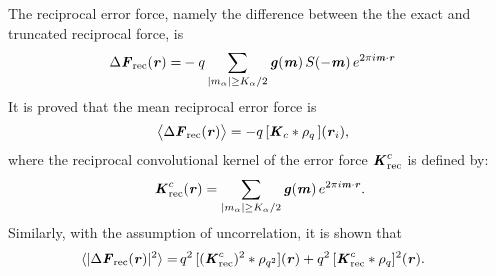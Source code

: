 \documentclass[aps,pre,preprint]{revtex4-1}
\renewcommand{\v}[1]{\textbf{\textit{#1}}}
\begin{document}
The reciprocal error force, namely the difference between the
the exact and truncated reciprocal force, is
\begin{align}
  \Delta \v F_{\textrm{rec}}(\v r)
  = & - 
  q
  \sum_{\vert m_\alpha\vert \geq K_\alpha/2}
  \v g(\v m) \,
  S(-\v m)\,
  e^{2\pi i\v m\cdot\v r} 
\end{align}
It is proved that the mean reciprocal error force is
\begin{align}
  \big\langle
  \Delta \v F_{\textrm{rec}}(\v r)
  \big\rangle
  &= 
  -q\,[\v K_c\ast\rho_q\,] (\v r_i),
\end{align}
where the reciprocal convolutional kernel of the error force $\v
K^c_{\textrm{rec}}$ is defined by:
\begin{align}
  \v K^c_{\textrm{rec}}(\v r) =
  \sum_{
      \vert m_\alpha\vert \geq K_\alpha/2}
  \v g(\v m) \,
  e^{2\pi i\v m\cdot\v r}.
\end{align}
Similarly, with the assumption of uncorrelation, it is shown that
\begin{align}
  \langle\vert\Delta\v F_{\textrm{rec}}(\v r)\vert^2\rangle
  = &\,
  q^2\,[(\v K^c_{\textrm{rec}})^2\ast\rho_{q^2}] (\v r) + 
  q^2\,[\v K^c_{\textrm{rec}}\ast\rho_{q}]^2 (\v r).
\end{align}
\end{document}
